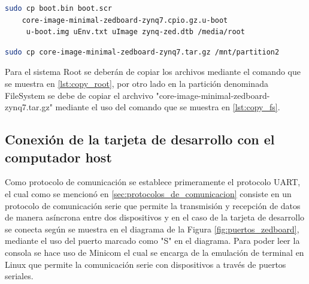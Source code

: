 \begin{lstlisting}[language=bash, caption={Copiar archivos root, Linux}, label=lst:copy_root]
    sudo cp boot.bin boot.scr 
    core-image-minimal-zedboard-zynq7.cpio.gz.u-boot
     u-boot.img uEnv.txt uImage zynq-zed.dtb /media/root
\end{lstlisting}

\begin{lstlisting}[language=bash, caption={Copiar sistema de archivos, Linux}, label=lst:copy_fs]
    sudo cp core-image-minimal-zedboard-zynq7.tar.gz /mnt/partition2
\end{lstlisting}

Para el sistema Root se deberán de copiar los archivos mediante el comando que se muestra en \ref{lst:copy_root}, por otro lado en la partición denominada FileSystem se debe de copiar el archvivo "core-image-minimal-zedboard-zynq7.tar.gz" mediante el uso del comando que se muestra en \ref{lst:copy_fs}.

\subsection{Conexión de la tarjeta de desarrollo con el computador host}

Como protocolo de comunicación se establece primeramente el protocolo UART, el cual como se mencionó en \ref{sec:protocolos_de_comunicacion} consiste en un protocolo de comunicación serie que permite la transmisión y recepción de datos de manera asíncrona entre dos dispositivos y en el caso de la tarjeta de desarrollo se conecta según se muestra en el diagrama de la Figura \ref{fig:puertos_zedboard}, mediante el uso del puerto marcado como "S" en el diagrama. Para poder leer la consola se hace uso de Minicom el cual se encarga de la emulación de terminal en Linux que permite la comunicación serie con dispositivos a través de puertos seriales.


